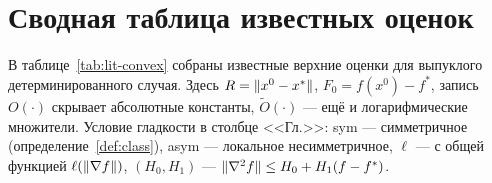 \clearpage
\section{Сводная таблица известных оценок}\label{app:literature}
 

В таблице~\ref{tab:lit-convex} собраны известные верхние оценки для выпуклого детерминированного случая. Здесь $R=\|x^0-x^\ast\|$, $F_0=f(x^0)-f^\ast$, запись $O(\cdot)$ скрывает абсолютные константы, $\widetilde O(\cdot)$ --- ещё и логарифмические множители. Условие гладкости в столбце <<Гл.>>: sym --- симметричное (определение~\ref{def:class}), asym --- локальное несимметричное, $\ell$ --- с общей функцией $\ell(\|\nabla f\|)$, $(H_0,H_1)$ --- $\|\nabla^2f\|\le H_0+H_1(f-f^\ast)$.

